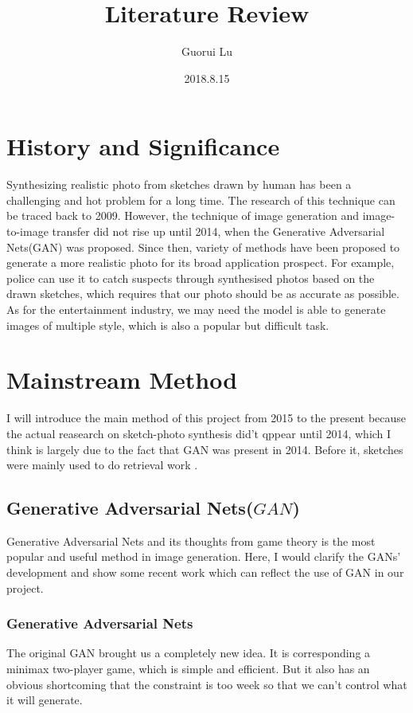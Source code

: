 \documentclass{article}
\title{Literature Review}
\author{Guorui Lu}
\date{2018.8.15}
\begin{document}
\maketitle

\section{History and Significance}
 
\indent Synthesizing realistic photo from sketches drawn by human has been a challenging and hot problem for a long time. The research of this technique can be traced back to 2009\cite{Chen2009Sketch2Photo}. However, the technique of image generation and image-to-image transfer did not rise up until 2014, when the Generative Adversarial Nets(GAN)\cite{Goodfellow2014Generative} was proposed. Since then, variety of methods have been proposed to generate a more realistic photo for its broad application prospect. For example, police can use it to catch suspects through synthesised photos based on the drawn sketches, which requires that our photo should be as accurate as possible. As for the entertainment industry, we may need the model is able to generate images of multiple style, which is also a popular but difficult task.

\section{Mainstream Method}
\indent I will introduce the main method of this project from 2015 to the present because the actual reasearch on sketch-photo synthesis did't qppear until 2014, which I think is largely due to the fact that GAN \cite{Goodfellow2014Generative} was present in 2014. Before it, sketches were mainly used to do retrieval work \cite{Cao2010MindFinder, Eitz2010An, Hu2010Gradient, Wang2010MindFinder, Cao2011Edgel, Hu2011A, Hu2013A, Lin20143D}.


\subsection{Generative Adversarial Nets($GAN$)}
Generative Adversarial Nets and its thoughts from game theory is the most popular and useful method in image generation. Here, I would clarify the GANs' development and show some recent work which can reflect the use of GAN in our project.




\subsubsection{Generative Adversarial Nets}
\indent The original GAN brought us a completely new idea. It is corresponding a minimax two-player game, which is simple and efficient. But it also has an obvious shortcoming that the constraint is too week so that we can't control what it will generate.
\end{document}
